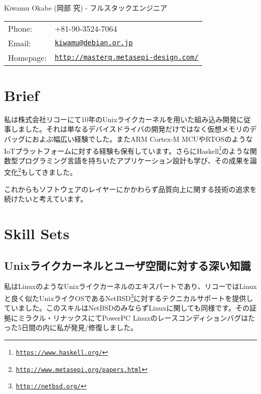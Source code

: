 \documentclass[letterpaper]{article}
\def\name{Kiwamu Okabe (岡部 究) - フルスタックエンジニア}
\begin{document}
{\huge \name}


\vspace{0.25in}

\begin{minipage}{0.3\linewidth}
  \begin{tabular}{ll}
    Phone: & +81-90-3524-7064 \\
    Email: & \href{mailto:kiwamu@debian.or.jp}{\tt kiwamu@debian.or.jp} \\
    Homepage: & \href{http://masterq.metasepi-design.com/}{\tt http://masterq.metasepi-design.com/} \\
  \end{tabular}
\end{minipage}

\section*{Brief}

私は株式会社リコーにて10年のUnixライクカーネルを用いた組み込み開発に従事しました。それは単なるデバイスドライバの開発だけではなく仮想メモリのデバッグにおよぶ幅広い経験でした。またARM Cortex-M MCUやRTOSのようなIoTプラットフォームに対する経験も保有しています。さらにHaskell\footnote{\href{https://www.haskell.org/}{\tt https://www.haskell.org/}}のような関数型プログラミング言語を持ちいたアプリケーション設計も学び、その成果を論文化\footnote{\href{http://www.metasepi.org/papers.html}{\tt http://www.metasepi.org/papers.html}}もしてきました。

これからもソフトウェアのレイヤーにかかわらず品質向上に関する技術の追求を続けたいと考えています。

\section*{Skill Sets}

\subsection*{Unixライクカーネルとユーザ空間に対する深い知識}

私はLinuxのようなUnixライクカーネルのエキスパートであり、リコーではLinuxと良く似たUnixライクOSであるNetBSD\footnote{\href{http://netbsd.org/}{\tt http://netbsd.org/}}に対するテクニカルサポートを提供していました。このスキルはNetBSDのみならずLinuxに関しても同様です。その証拠にミラクル・リナックスにてPowerPC Linuxのレースコンディションバグはたった5日間の内に私が発見/修復しました。
\end{document}
